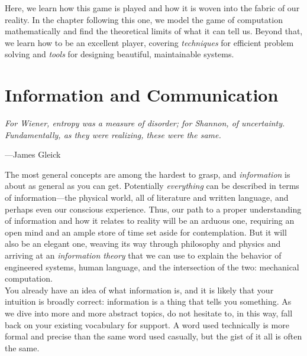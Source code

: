 Here, we learn how this game is played and how it is woven into the fabric of our reality. In the chapter following this one, we model the game of computation mathematically and find the theoretical limits of what it can tell us. Beyond that, we learn how to be an excellent player, covering \textit{techniques} for efficient problem solving and \textit{tools} for designing beautiful, maintainable systems.


\toclineskip
\section{Information and Communication}

\vspace{4mm}
\begin{displayquote}
	\textit{For Wiener, entropy was a measure of disorder; for Shannon, of uncertainty. Fundamentally, as they were realizing, these were the same.}
	\begin{flushright}
		---James Gleick
	\end{flushright}
\end{displayquote}
\vspace{4mm}

The most general concepts are among the hardest to grasp, and \textit{information} is about as general as you can get. Potentially \textit{everything} can be described in terms of information---the physical world, all of literature and written language, and perhaps even our conscious experience. Thus, our path to a proper understanding of information and how it relates to reality will be an arduous one, requiring an open mind and an ample store of time set aside for contemplation. But it will also be an elegant one, weaving its way through philosophy and physics and arriving at an \textit{information theory} that we can use to explain the behavior of engineered systems, human language, and the intersection of the two: mechanical computation. \\

You already have an idea of what information is, and it is likely that your intuition is broadly correct: information is a thing that tells you something. As we dive into more and more abstract topics, do not hesitate to, in this way, fall back on your existing vocabulary for support. A word used technically is more formal and precise than the same word used casually, but the gist of it all is often the same. \\


